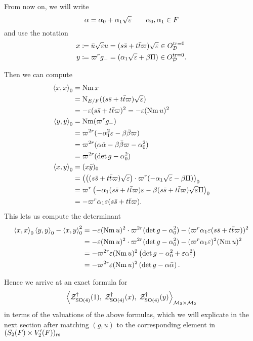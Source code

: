 From now on, we will write
\[ \alpha = \alpha_0 + \alpha_1 \sqrt{\varepsilon} \qquad \alpha_0, \alpha_1 \in F \]
and use the notation
\begin{align*}
  x &\coloneqq \bar u \sqrt{\varepsilon} u = (s \bar s + t \bar t \varpi) \sqrt{\varepsilon} \in O_\mathcal D^{\operatorname{tr} = 0} \\
  y &\coloneqq \varpi^r g_- = (\alpha_1\sqrt{\varepsilon} + \beta \Pi) \in O_\mathcal D^{\operatorname{tr} = 0}.
\end{align*}

Then we can compute
\begin{align*}
  \left\langle x,x \right\rangle _0 &= \operatorname{Nm} x \\
  &= \operatorname{N}_{E/F}((s \bar s + t \bar t \varpi)\sqrt{\varepsilon}) \\
  &= -\varepsilon(s \bar s + t \bar t \varpi)^2 = -\varepsilon (\operatorname{Nm} u)^2 \\
  \left\langle y,y \right\rangle _0 &= \operatorname{Nm} (\varpi^r g_-) \\
  &= \varpi^{2r} (-\alpha_1^2 \varepsilon - \beta\bar\beta \varpi) \\
  &= \varpi^{2r} (\alpha\bar\alpha - \beta\bar\beta \varpi - \alpha_0^2) \\
  &= \varpi^{2r}(\det g - \alpha_0^2) \\
  \left\langle x,y \right\rangle _0 &= (x \bar y)_0 \\
  &= \left( \left( (s \bar s + t \bar t \varpi) \sqrt{\varepsilon} \right)
    \cdot \varpi^{r} (-\alpha_1\sqrt{\varepsilon} - \beta \Pi) \right)_0 \\
  &= \varpi^r \left( -\alpha_1 (s \bar s + t \bar t \varpi) \varepsilon
    - \beta (s \bar s + t \bar t \varpi) \sqrt{\varepsilon} \Pi \right)_0 \\
  &= - \varpi^r \alpha_1 \varepsilon (s \bar s + t \bar t \varpi).
\end{align*}
This lets us compute the determinant
\begin{align*}
  \left\langle x,x \right\rangle _0 \left\langle y,y \right\rangle _0 - \left\langle x,y \right\rangle^2_0
  &= - \varepsilon (\operatorname{Nm} u)^2\cdot \varpi^{2r} (\det g - \alpha_0^2)
  - (\varpi^r \alpha_1 \varepsilon (s \bar s + t \bar t \varpi))^2 \\
  &= - \varepsilon (\operatorname{Nm} u)^2\cdot \varpi^{2r} (\det g - \alpha_0^2)
  - (\varpi^r \alpha_1 \varepsilon)^2 (\operatorname{Nm} u)^2 \\
  &= -\varpi^{2r} \varepsilon (\operatorname{Nm} u)^2  \left( \det g - \alpha_0^2 + \varepsilon \alpha_1^2 \right) \\
  &= -\varpi^{2r} \varepsilon (\operatorname{Nm} u)^2  \left( \det g - \alpha \bar\alpha \right).
\end{align*}

Hence we arrive at an exact formula for
\[ \left< \mathcal Z^{\dagger}_{\operatorname{SO}(4)}(1), \; \mathcal Z^{\dagger}_{\operatorname{SO}(4)}(x), \; \mathcal Z^{\dagger}_{\operatorname{SO}(4)}(y) \right>_{\mathcal M_2 \times \mathcal M_2} \]
in terms of the valuations of the above formulas,
which we will explicate in the next section after matching $(g,u)$
to the corresponding element in $(S_2(F) \times V_2'(F))_{\mathrm{rs}}$
